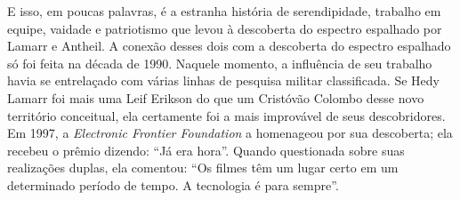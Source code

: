 \documentclass{book}
\newcommand{\ingles}[1]{\textit{#1}}
\begin{document}
E isso, em poucas palavras, é a estranha história de serendipidade, trabalho em
equipe, vaidade e patriotismo que levou à descoberta do espectro espalhado por
Lamarr e Antheil. A conexão desses dois com a descoberta do espectro espalhado
só foi feita na década de 1990. Naquele momento, a influência de seu trabalho
havia se entrelaçado com várias linhas de pesquisa militar classificada. Se Hedy
Lamarr foi mais uma Leif Erikson do que um Cristóvão Colombo desse novo território
conceitual, ela certamente foi a mais improvável de seus descobridores. Em 1997,
a \ingles{Electronic Frontier Foundation} a homenageou por sua descoberta; ela
recebeu o prêmio dizendo: ``Já era hora''. Quando questionada sobre suas
realizações duplas, ela comentou: ``Os filmes têm um lugar certo em um determinado
período de tempo. A tecnologia é para sempre''.
\end{document}
